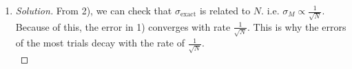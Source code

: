 \begin{enumerate} [1)]
\begin{proof} [Solution]
			From this, we can check that $\mu_M \simeq \mu_{\mbox{exact}}$ and $\sigma_M \times 10 \simeq \sigma_{\mbox{exact}}$. Note that the coefficient `10' comes from the sample size $N = 100$.\\
		\end{proof}
		\item \begin{proof} [Solution]
			From 2), we can check that $\sigma_{\mbox{exact}}$ is related to $N$. i.e. $\sigma_M \propto \frac{1}{\sqrt{N}}$. Because of this, the error in 1) converges with rate $\frac{1}{\sqrt{N}}$. This is why the errors of the most trials decay with the rate of $\frac{1}{\sqrt{N}}$.\\
		\end{proof}
	\end{enumerate}